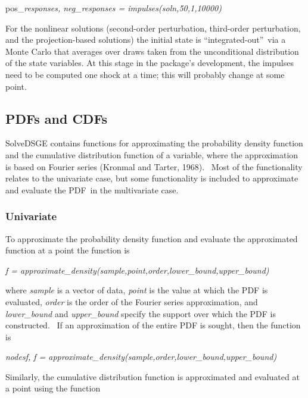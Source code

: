 \documentclass[notitlepage,11pt]{article}
\begin{document}
pos\_\textit{responses, neg\_responses = impulses(soln,50,1,10000)}

\bigskip

For the nonlinear solutions (second-order perturbation, third-order
perturbation, and the projection-based solutions) the initial state is
\textquotedblleft integrated-out\textquotedblright\ via a Monte Carlo that
averages over draws taken from the unconditional distribution of the state
variables. At this stage in the package's development, the impulses need to
be computed one shock at a time; this will probably change at some point.

\subsection{PDFs and CDFs}

SolveDSGE contains functions for approximating the probability density
function and the cumulative distribution function of a variable, where the
approximation is based on Fourier series (Kronmal and Tarter, 1968). \ Most
of the functionality relates to the univariate case, but some functionality
is included to approximate and evaluate the PDF\ in the multivariate case.

\subsubsection{Univariate}

To approximate the probability density function and evaluate the
approximated function at a point the function is

\bigskip

\textit{f =
approximate\_density(sample,point,order,lower\_bound,upper\_bound)}

where \textit{sample} is a vector of data, \textit{point} is the value at
which the PDF is evaluated, \textit{order} is the order of the Fourier
series approximation, and \textit{lower\_bound} and \textit{upper\_bound}
specify the support over which the PDF is constructed. \ If an approximation
of the entire PDF is sought, then the function is

\bigskip 

\textit{nodesf, f =
approximate\_density(sample,order,lower\_bound,upper\_bound)}

\bigskip 

Similarly, the cumulative distribution function is approximated and
evaluated at a point using the function

\bigskip
\end{document}
